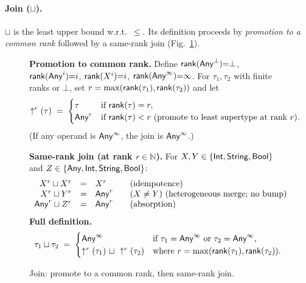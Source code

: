 \paragraph{Join (\texorpdfstring{$\sqcup$}{sqcup}).}
$\sqcup$ is the least upper bound w.r.t.\ $\le$.
Its definition proceeds by \emph{promotion to a common rank} followed by a same-rank join (Fig.~\ref{fig:join}).

\begin{figure}[t]
\centering
\textbf{Promotion to common rank.}
Define $\mathsf{rank}(\mathsf{Any}^{\bot}){=}\bot$, $\mathsf{rank}(\mathsf{Any}^{i}){=}i$, $\mathsf{rank}(X^{i}){=}i$, $\mathsf{rank}(\mathsf{Any}^{\infty}){=}\infty$.
For $\tau_1,\tau_2$ with finite ranks or $\bot$, set $r=\max(\mathsf{rank}(\tau_1),\mathsf{rank}(\tau_2))$ and let
\[
\uparrow^{r}(\tau) \;=\;
\begin{cases}
\tau & \text{if } \mathsf{rank}(\tau)=r,\\
\mathsf{Any}^{r} & \text{if } \mathsf{rank}(\tau)<r\text{ (promote to least supertype at rank $r$).}
\end{cases}
\]
(If any operand is $\mathsf{Any}^{\infty}$, the join is $\mathsf{Any}^{\infty}$.)

\medskip
\textbf{Same-rank join (at rank $r\in\mathbb{N}$).}
For $X,Y\in\{\mathsf{Int},\mathsf{String},\mathsf{Bool}\}$ and $Z\in\{\mathsf{Any},\mathsf{Int},\mathsf{String},\mathsf{Bool}\}$:
\[
\begin{array}{r@{\quad=\quad}l@{\qquad}l}
X^{r} \sqcup X^{r} & X^{r} & \text{(idempotence)}\\
X^{r} \sqcup Y^{r} & \Any^{r} & (X\neq Y)\ \text{(heterogeneous merge; no bump)}\\
\Any^{r} \sqcup Z^{r} & \Any^{r} & \text{(absorption)}\\
\end{array}
\]
\medskip
\textbf{Full definition.}
\[
\tau_1 \sqcup \tau_2 \;=\;
\begin{cases}
\mathsf{Any}^{\infty} & \text{if }\tau_1=\mathsf{Any}^{\infty}\text{ or }\tau_2=\mathsf{Any}^{\infty},\\
\uparrow^{r}(\tau_1)\ \sqcup\ \uparrow^{r}(\tau_2) & \text{where } r=\max(\mathsf{rank}(\tau_1),\mathsf{rank}(\tau_2)).
\end{cases}
\]
\vspace{-1mm}
\caption{Join: promote to a common rank, then same-rank join.}
\label{fig:join}
\end{figure}


